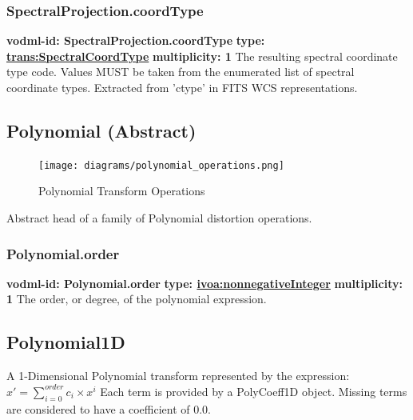     \subsubsection{SpectralProjection.coordType}
      \textbf{vodml-id: SpectralProjection.coordType} \newline
      \textbf{type: \hyperref[sect:SpectralCoordType]{trans:SpectralCoordType}} \newline
      \textbf{multiplicity: 1} \newline 
      The resulting spectral coordinate type code. Values MUST be taken from the enumerated list of spectral coordinate types. Extracted from 'ctype' in FITS WCS representations.

  \subsection{Polynomial (Abstract)}
  \label{sect:Polynomial}
    \begin{figure}[h]
    \begin{center}
      \texttt{[image: diagrams/polynomial\_operations.png]}
      \caption{Polynomial Transform Operations}\label{fig:PolyOps}
    \end{center}
    \end{figure}

    Abstract head of a family of Polynomial distortion operations.

    \subsubsection{Polynomial.order}
      \textbf{vodml-id: Polynomial.order} \newline
      \textbf{type: \hyperref[sect:ivoa]{ivoa:nonnegativeInteger}} \newline
      \textbf{multiplicity: 1} \newline 
      The order, or degree, of the polynomial expression.

  \subsection{Polynomial1D}
  \label{sect:Polynomial1D}
    A 1-Dimensional Polynomial transform represented by the expression:
    \indent $x' = \sum_{i=0}^{order} c_i\times x^{i} $ \newline
    Each term is provided by a PolyCoeff1D object. Missing terms are considered to have a coefficient of 0.0.

